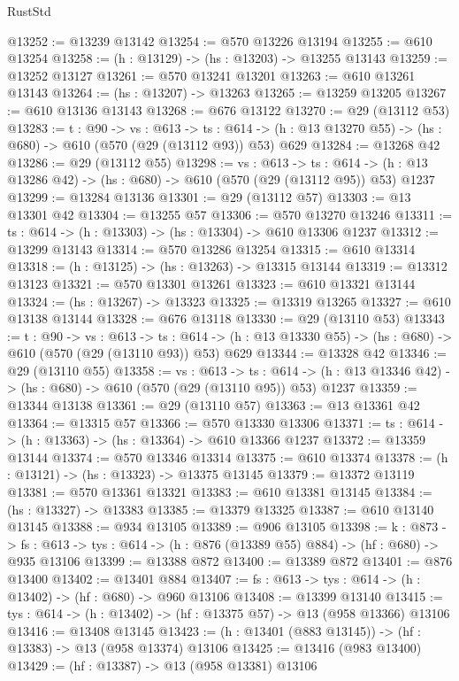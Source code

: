 \begin{lexlean}{RustStd}
\begin{coremodule}
@13252 := @13239 @13142
@13254 := @570 @13226 @13194
@13255 := @610 @13254
@13258 := (h : @13129) -> (hs : @13203) -> @13255 @13143
@13259 := @13252 @13127
@13261 := @570 @13241 @13201
@13263 := @610 @13261 @13143
@13264 := (hs : @13207) -> @13263
@13265 := @13259 @13205
@13267 := @610 @13136 @13143
@13268 := @676 @13122
@13270 := @29 (@13112 @53)
@13283 := {t : @90} ->
  {vs : @613} ->
  {ts : @614} -> (h : @13 @13270 @55) -> (hs : @680) -> @610 (@570 (@29 (@13112 @93)) @53) @629
@13284 := @13268 @42
@13286 := @29 (@13112 @55)
@13298 := {vs : @613} ->
  {ts : @614} -> (h : @13 @13286 @42) -> (hs : @680) -> @610 (@570 (@29 (@13112 @95)) @53) @1237
@13299 := @13284 @13136
@13301 := @29 (@13112 @57)
@13303 := @13 @13301 @42
@13304 := @13255 @57
@13306 := @570 @13270 @13246
@13311 := {ts : @614} -> (h : @13303) -> (hs : @13304) -> @610 @13306 @1237
@13312 := @13299 @13143
@13314 := @570 @13286 @13254
@13315 := @610 @13314
@13318 := (h : @13125) -> (hs : @13263) -> @13315 @13144
@13319 := @13312 @13123
@13321 := @570 @13301 @13261
@13323 := @610 @13321 @13144
@13324 := (hs : @13267) -> @13323
@13325 := @13319 @13265
@13327 := @610 @13138 @13144
@13328 := @676 @13118
@13330 := @29 (@13110 @53)
@13343 := {t : @90} ->
  {vs : @613} ->
  {ts : @614} -> (h : @13 @13330 @55) -> (hs : @680) -> @610 (@570 (@29 (@13110 @93)) @53) @629
@13344 := @13328 @42
@13346 := @29 (@13110 @55)
@13358 := {vs : @613} ->
  {ts : @614} -> (h : @13 @13346 @42) -> (hs : @680) -> @610 (@570 (@29 (@13110 @95)) @53) @1237
@13359 := @13344 @13138
@13361 := @29 (@13110 @57)
@13363 := @13 @13361 @42
@13364 := @13315 @57
@13366 := @570 @13330 @13306
@13371 := {ts : @614} -> (h : @13363) -> (hs : @13364) -> @610 @13366 @1237
@13372 := @13359 @13144
@13374 := @570 @13346 @13314
@13375 := @610 @13374
@13378 := (h : @13121) -> (hs : @13323) -> @13375 @13145
@13379 := @13372 @13119
@13381 := @570 @13361 @13321
@13383 := @610 @13381 @13145
@13384 := (hs : @13327) -> @13383
@13385 := @13379 @13325
@13387 := @610 @13140 @13145
@13388 := @934 @13105
@13389 := @906 @13105
@13398 := {k : @873} ->
  {fs : @613} -> {tys : @614} -> (h : @876 (@13389 @55) @884) -> (hf : @680) -> @935 @13106
@13399 := @13388 @872
@13400 := @13389 @872
@13401 := @876 @13400
@13402 := @13401 @884
@13407 := {fs : @613} -> {tys : @614} -> (h : @13402) -> (hf : @680) -> @960 @13106
@13408 := @13399 @13140
@13415 := {tys : @614} -> (h : @13402) -> (hf : @13375 @57) -> @13 (@958 @13366) @13106
@13416 := @13408 @13145
@13423 := (h : @13401 (@883 @13145)) -> (hf : @13383) -> @13 (@958 @13374) @13106
@13425 := @13416 (@983 @13400)
@13429 := (hf : @13387) -> @13 (@958 @13381) @13106

\end{coremodule}
\end{lexlean}
